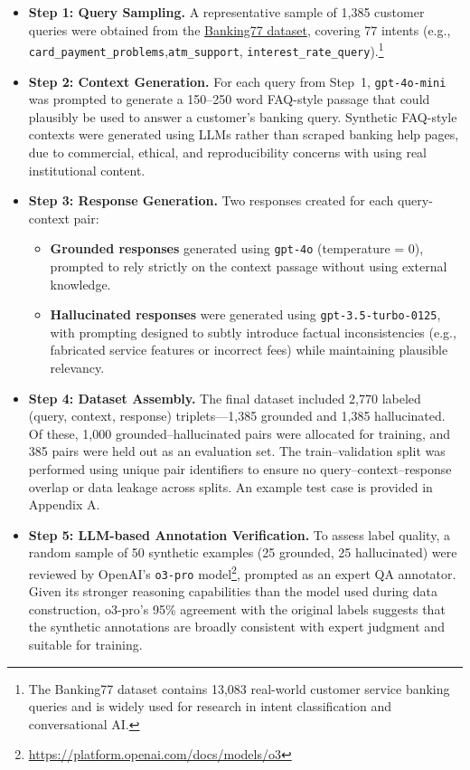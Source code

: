 \documentclass[11pt]{article}
\begin{document}
\begin{itemize}
    \item \textbf{Step 1: Query Sampling.} A representative sample of 1,385 customer queries were obtained from the \href{https://huggingface.co/datasets/PolyAI/banking77}{Banking77 dataset}, covering 77 intents (e.g., \texttt{card\_payment\_problems},\texttt{atm\_support}, \texttt{interest\_rate\_query}).\footnote{The Banking77 dataset contains 13,083 real-world customer service banking queries and is widely used for research in intent classification and conversational AI.}
    
    \item \textbf{Step 2: Context Generation.} For each query from Step~1, \texttt{gpt-4o-mini} was prompted to generate a 150--250 word FAQ-style passage that could plausibly be used to answer a customer’s banking query. Synthetic FAQ-style contexts were generated using LLMs rather than scraped banking help pages, due to commercial, ethical, and reproducibility concerns with using real institutional content.
  
    \item \textbf{Step 3: Response Generation.} Two responses created for each query-context pair:
    \begin{itemize}
        \item \textbf{Grounded responses} generated using \texttt{gpt-4o} (temperature = 0), prompted to rely strictly on the context passage without using external knowledge.
        \item \textbf{Hallucinated responses} were generated using \texttt{gpt-3.5-turbo-0125}, with prompting designed to subtly introduce factual inconsistencies (e.g., fabricated service features or incorrect fees) while maintaining plausible relevancy.
    \end{itemize}
    
    \item \textbf{Step 4: Dataset Assembly.} The final dataset included 2,770 labeled (query, context, response) triplets—1,385 grounded and 1,385 hallucinated. Of these, 1,000 grounded–hallucinated pairs were allocated for training, and 385 pairs were held out as an evaluation set. The train–validation split was performed using unique pair identifiers to ensure no query–context–response overlap or data leakage across splits. An example test case is provided in Appendix A.
    \item \textbf{Step 5: LLM-based Annotation Verification.} To assess label quality, a random sample of 50 synthetic examples (25 grounded, 25 hallucinated) were reviewed by OpenAI’s \texttt{o3-pro} model\footnote{\url{https://platform.openai.com/docs/models/o3}}, prompted as an expert QA annotator.  Given its stronger reasoning capabilities than the model used during data construction, o3-pro’s 95\% agreement with the original labels suggests that the synthetic annotations are broadly consistent with expert judgment and suitable for training.

\end{itemize}
\end{document}
